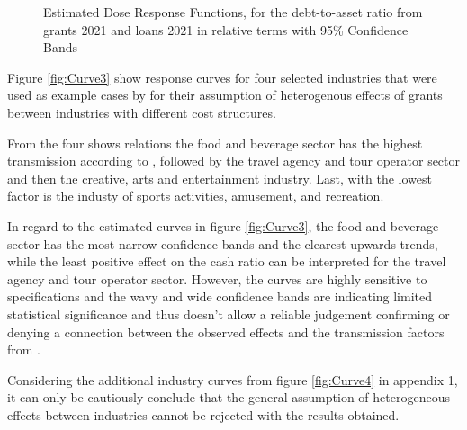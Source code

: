 \begin{figure}
    \centering
    
    \decoRule
    \caption[Response curves for indebtedness through aid]{Estimated Dose Response Functions, for the debt-to-asset ratio from grants 2021 and loans 2021 in relative terms with 95\% Confidence Bands}
    \label{fig:Curve2}
\end{figure}


Figure \ref{fig:Curve3} show response curves for four selected industries that were used as example cases by \parencite{bischof_bedeutung_2021} for their assumption of heterogenous effects of grants between industries with different cost structures.


From the four shows relations the food and beverage sector has the highest transmission according to \parencite{bischof_bedeutung_2021}, followed by the travel agency and tour operator sector and then the creative, arts and entertainment industry. Last, with the lowest factor is the industy of sports activities, amusement, and recreation.

In regard to the estimated curves in figure \ref{fig:Curve3}, the food and beverage sector has the most narrow confidence bands and the clearest upwards trends, while the least positive effect on the cash ratio can be interpreted for the travel agency and tour operator sector. However, the curves are highly sensitive to specifications and the wavy and wide confidence bands are indicating limited statistical significance and thus doesn't allow a reliable judgement confirming or denying a connection between the observed effects and the transmission factors from \parencite{bischof_bedeutung_2021}. 

Considering the additional industry curves from figure \ref{fig:Curve4} in appendix 1, it can only be cautiously conclude that the general assumption of heterogeneous effects between industries cannot be rejected with the results obtained.






